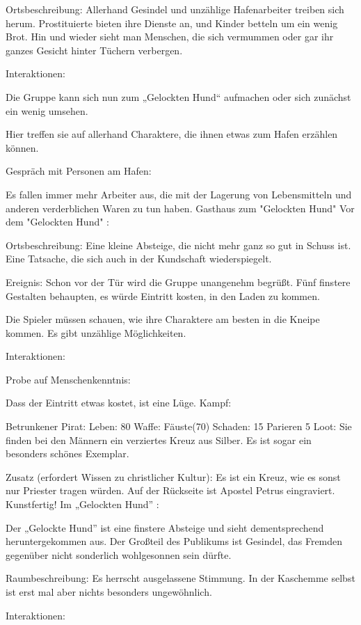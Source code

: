 Ortsbeschreibung: Allerhand Gesindel und unzählige Hafenarbeiter treiben sich herum. Prostituierte bieten ihre Dienste an, und Kinder betteln um ein wenig Brot. Hin und wieder sieht man Menschen, die sich vermummen oder gar ihr ganzes Gesicht hinter Tüchern verbergen.

Interaktionen:

Die Gruppe kann sich nun zum „Gelockten Hund“ aufmachen oder sich zunächst ein wenig umsehen.

Hier treffen sie auf allerhand Charaktere, die ihnen etwas zum Hafen erzählen können.

Gespräch mit Personen am Hafen:

Es fallen immer mehr Arbeiter aus, die mit der Lagerung von Lebensmitteln und anderen verderblichen Waren zu tun haben.
Gasthaus zum "Gelockten Hund"
Vor dem "Gelockten Hund"
:

Ortsbeschreibung: Eine kleine Absteige, die nicht mehr ganz so gut in Schuss ist. Eine Tatsache, die sich auch in der Kundschaft wiederspiegelt.

Ereignis: Schon vor der Tür wird die Gruppe unangenehm begrüßt. Fünf finstere Gestalten behaupten, es würde Eintritt kosten, in den Laden zu kommen.

Die Spieler müssen schauen, wie ihre Charaktere am besten in die Kneipe kommen. Es gibt unzählige Möglichkeiten.


Interaktionen:

Probe auf Menschenkenntnis:

Dass der Eintritt etwas kostet, ist eine Lüge.
Kampf:

Betrunkener Pirat:
Leben: 80
Waffe: Fäuste(70)
Schaden: 15
Parieren 5
Loot:
Sie finden bei den Männern ein verziertes Kreuz aus Silber. Es ist sogar ein besonders schönes Exemplar.

Zusatz (erfordert Wissen zu christlicher Kultur):
Es ist ein Kreuz, wie es sonst nur Priester tragen würden.
Auf der Rückseite ist Apostel Petrus eingraviert. Kunstfertig!
Im „Gelockten Hund”
:

Der „Gelockte Hund” ist eine finstere Absteige und sieht dementsprechend heruntergekommen aus. Der Großteil des Publikums ist Gesindel, das Fremden gegenüber nicht sonderlich wohlgesonnen sein dürfte.

Raumbeschreibung: Es herrscht ausgelassene Stimmung. In der Kaschemme selbst ist erst mal aber nichts besonders ungewöhnlich.

Interaktionen:

